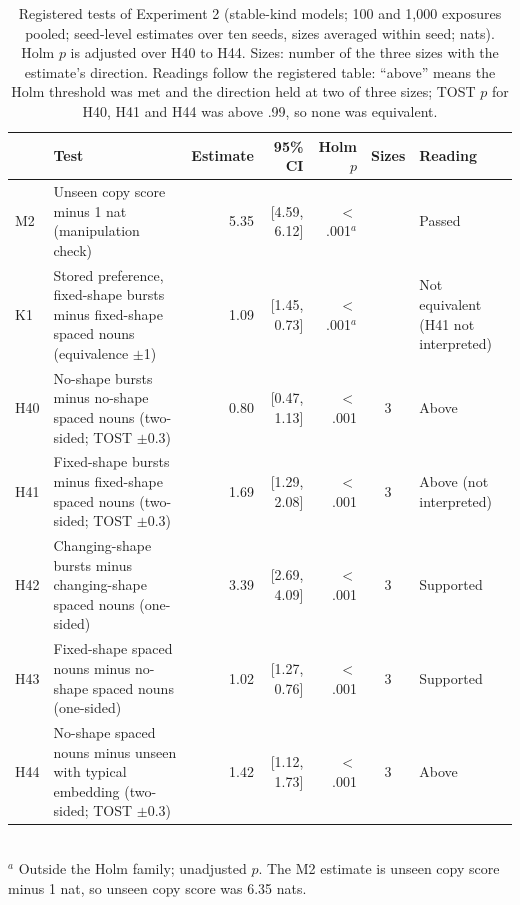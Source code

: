 \begin{table}[!htbp]
\centering\small
\caption{Registered tests of Experiment 2 (stable-kind models; 100 and 1,000 exposures pooled; seed-level estimates over ten seeds, sizes averaged within seed; nats). Holm $p$ is adjusted over H40 to H44. Sizes: number of the three sizes with the estimate's direction. Readings follow the registered table: ``above'' means the Holm threshold was met and the direction held at two of three sizes; TOST $p$ for H40, H41 and H44 was above .99, so none was equivalent.}
\label{tab:N1}
\begin{tabular}{@{}lp{}rrrcp{}@{}}
\toprule
& Test & Estimate & 95\% CI & Holm $p$ & Sizes & Reading \\
\midrule
M2 & Unseen copy score minus 1 nat (manipulation check) & 5.35 & [4.59, 6.12] & $<$.001$^a$ &  & Passed \\
K1 & Stored preference, fixed-shape bursts minus fixed-shape spaced nouns (equivalence $\pm$1) & \textminus{}1.09 & [\textminus{}1.45, \textminus{}0.73] & $<$.001$^a$ &  & Not equivalent (H41 not interpreted) \\
H40 & No-shape bursts minus no-shape spaced nouns (two-sided; TOST $\pm$0.3) & 0.80 & [0.47, 1.13] & $<$.001 & 3 & Above \\
H41 & Fixed-shape bursts minus fixed-shape spaced nouns (two-sided; TOST $\pm$0.3) & 1.69 & [1.29, 2.08] & $<$.001 & 3 & Above (not interpreted) \\
H42 & Changing-shape bursts minus changing-shape spaced nouns (one-sided) & 3.39 & [2.69, 4.09] & $<$.001 & 3 & Supported \\
H43 & Fixed-shape spaced nouns minus no-shape spaced nouns (one-sided) & \textminus{}1.02 & [\textminus{}1.27, \textminus{}0.76] & $<$.001 & 3 & Supported \\
H44 & No-shape spaced nouns minus unseen with typical embedding (two-sided; TOST $\pm$0.3) & 1.42 & [1.12, 1.73] & $<$.001 & 3 & Above \\
\bottomrule
\end{tabular}
\\[2pt]{\footnotesize $^a$ Outside the Holm family; unadjusted $p$. The M2 estimate is unseen copy score minus 1 nat, so unseen copy score was 6.35 nats.}
\end{table}

